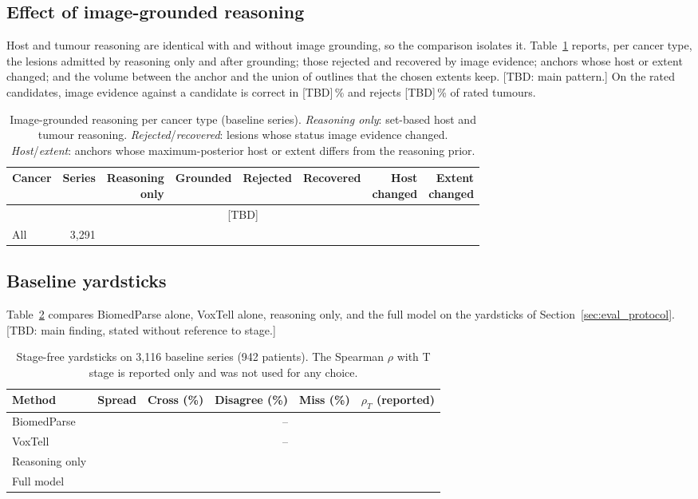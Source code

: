 \documentclass[fleqn,10pt]{olplainarticle}
\begin{document}
\subsection{Effect of image-grounded reasoning}
\label{sec:results_r2}
Host and tumour reasoning are identical with and without image grounding, so the comparison isolates it.
Table~\ref{tab:r2_by_type} reports, per cancer type, the lesions admitted by reasoning only and after grounding; those
rejected and recovered by image evidence; anchors whose host or extent changed; and the volume between the anchor and the
union of outlines that the chosen extents keep. [TBD: main pattern.] On the rated candidates, image evidence against a
candidate is correct in [TBD]\,\% and rejects [TBD]\,\% of rated tumours.

\begin{table}[t]
\centering\small
\caption{Image-grounded reasoning per cancer type (baseline series). \emph{Reasoning only}: set-based host and tumour
reasoning. \emph{Rejected}/\emph{recovered}: lesions whose status image evidence changed. \emph{Host}/\emph{extent}: anchors
whose maximum-posterior host or extent differs from the reasoning prior.}
\label{tab:r2_by_type}
\setlength{\tabcolsep}{4pt}\footnotesize
\begin{tabular}{lrrrrrrr}
\hline
Cancer & Series & \shortstack{Reasoning\\only} & Grounded & Rejected & Recovered & \shortstack{Host\\changed} & \shortstack{Extent\\changed}\\
\hline
\multicolumn{8}{c}{[TBD]}\\
\hline
All & 3{,}291 & & & & & & \\
\hline
\end{tabular}
\end{table}

\subsection{Baseline yardsticks}
\label{sec:results_yardsticks}
Table~\ref{tab:yardsticks} compares BiomedParse alone, VoxTell alone, reasoning only, and the full model on the
yardsticks of Section~\ref{sec:eval_protocol}. [TBD: main finding, stated without reference to stage.]

\begin{table}[t]
\centering\small
\caption{Stage-free yardsticks on 3{,}116 baseline series (942 patients). The Spearman $\rho$ with T stage is reported
only and was not used for any choice.}
\label{tab:yardsticks}
\begin{tabular}{lrrrrr}
\hline
Method & Spread & Cross (\%) & Disagree (\%) & Miss (\%) & $\rho_T$ (reported)\\
\hline
BiomedParse & & & -- & & \\
VoxTell & & & -- & & \\
Reasoning only & & & & & \\
Full model & & & & & \\
\hline
\end{tabular}
\end{table}
\end{document}
